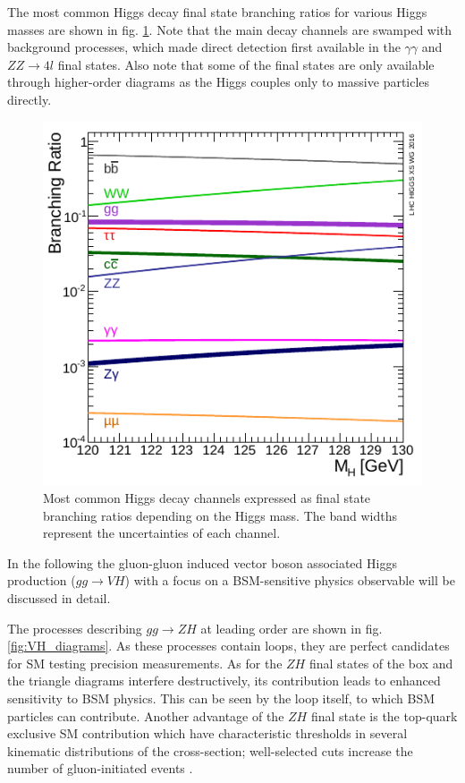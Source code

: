 The most common Higgs decay final state branching ratios for various Higgs masses are shown in fig. \ref{fig:higgsbranch}. Note that the main decay channels are swamped with background processes, which made direct detection first available in the $\gamma\gamma$ and $ZZ\rightarrow4l$ final states. Also note that some of the final states are only available through higher-order diagrams as the Higgs couples only to massive particles directly.

\begin{figure}[h!]
	\centering
	\includegraphics[width=0.6\linewidth]{figures/theory/higgsdecay.pdf}
	\caption{Most common Higgs decay channels expressed as final state branching ratios depending on the Higgs mass. The band widths represent the uncertainties of each channel. \cite{HiggsCrossSections}}
	\label{fig:higgsbranch}
\end{figure}

In the following the gluon-gluon induced vector boson associated Higgs production ($gg\rightarrow VH$) with a focus on a BSM-sensitive physics observable will be discussed in detail.


The processes describing $gg\rightarrow ZH$ at leading order are shown in fig. \ref{fig:VH_diagrams}. As these processes contain loops, they are perfect candidates for SM testing precision measurements. As for the $ZH$ final states of the box and the triangle diagrams interfere destructively, its contribution leads to enhanced sensitivity to BSM physics. This can be seen by the loop itself, to which BSM particles can contribute. Another advantage of the $ZH$ final state is the top-quark exclusive SM contribution which have characteristic thresholds in several kinematic distributions of the cross-section; well-selected cuts increase the number of gluon-initiated events \cite{Harlander_2018}.

